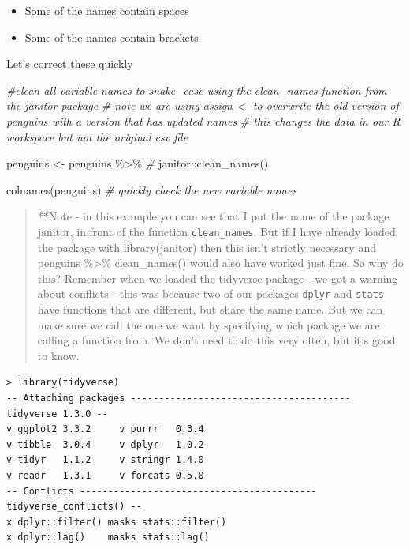 \documentclass[
]{book}
\newenvironment{Shaded}{\begin{snugshade}}{\end{snugshade}}
\newcommand{\CommentTok}[1]{\textcolor[rgb]{0.56,0.35,0.01}{\textit{#1}}}
\newcommand{\FunctionTok}[1]{\textcolor[rgb]{0.00,0.00,0.00}{#1}}
\newcommand{\NormalTok}[1]{#1}
\newcommand{\OtherTok}[1]{\textcolor[rgb]{0.56,0.35,0.01}{#1}}
\newcommand{\SpecialCharTok}[1]{\textcolor[rgb]{0.00,0.00,0.00}{#1}}
\begin{document}
\begin{itemize}
\item
  Some of the names contain spaces
\item
  Some of the names contain brackets
\end{itemize}

Let's correct these quickly

\begin{Shaded}
\begin{Highlighting}[]
\CommentTok{\#clean all variable names to snake\_case using the clean\_names function from the janitor package}
\CommentTok{\# note we are using assign \textless{}{-} to overwrite the old version of penguins with a version that has updated names}
\CommentTok{\# this changes the data in our R workspace but not the original csv file}

\NormalTok{penguins }\OtherTok{\textless{}{-}}\NormalTok{ penguins }\SpecialCharTok{\%\textgreater{}\%} \CommentTok{\#}
\NormalTok{  janitor}\SpecialCharTok{::}\FunctionTok{clean\_names}\NormalTok{()}

\FunctionTok{colnames}\NormalTok{(penguins) }\CommentTok{\# quickly check the new variable names}
\end{Highlighting}
\end{Shaded}

\begin{quote}
**Note - in this example you can see that I put the name of the package janitor, in front of the function \texttt{clean\_names}. But if I have already loaded the package with library(janitor) then this isn't strictly necessary and penguins \%\textgreater\% clean\_names() would also have worked just fine. So why do this? Remember when we loaded the tidyverse package - we got a warning about conflicts - this was because two of our packages \texttt{dplyr} and \texttt{stats} have functions that are different, but share the same name. But we can make sure we call the one we want by specifying which package we are calling a function from. We don't need to do this very often, but it's good to know.
\end{quote}

\begin{verbatim}
> library(tidyverse)
-- Attaching packages --------------------------------------- tidyverse 1.3.0 --
v ggplot2 3.3.2     v purrr   0.3.4
v tibble  3.0.4     v dplyr   1.0.2
v tidyr   1.1.2     v stringr 1.4.0
v readr   1.3.1     v forcats 0.5.0
-- Conflicts ------------------------------------------ tidyverse_conflicts() --
x dplyr::filter() masks stats::filter()
x dplyr::lag()    masks stats::lag()
\end{verbatim}
\end{document}
